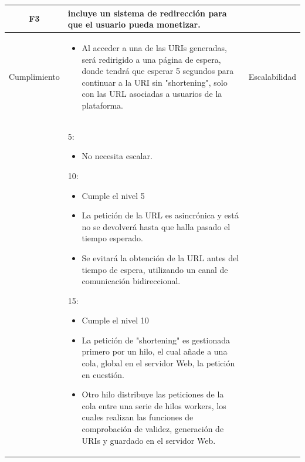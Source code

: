 \documentclass{article}
\begin{document}
 
\begin{table}[hbtp]
    \footnotesize
    \centering
    \settowidth{}
    \setlength\extrarowheight{5pt}
    \begin{tabulary}{\textwidth}{ C L }
        \textbf{F3} & incluye un sistema de redirección para que el usuario pueda monetizar.
        \\
    \hline
    
    Cumplimiento &
    \begin{itemize}
        
        \item Al acceder a una de las URIs generadas, será redirigido a una página de espera, donde tendrá que esperar 5 segundos para continuar a la URI sin "shortening", solo con las URL asociadas a usuarios de la plataforma.
        
    \end{itemize} &
        
    Escalabilidad\\ &
    5:
    \begin{itemize}
        \item No necesita escalar.
        
    \end{itemize} 
    10:
    \begin{itemize}
        \item Cumple el nivel 5
		
        \item La petición de la URL es asincrónica y está no se devolverá hasta que halla pasado el tiempo esperado.
        \item Se evitará la obtención de la URL antes del tiempo de espera, utilizando un canal de comunicación bidireccional.
        
    \end{itemize} 
    15:
    \begin{itemize}
        \item Cumple el nivel 10
        
        \item La petición de "shortening" es gestionada primero por un hilo, el cual añade a una cola, global en el servidor Web, la petición en cuestión.
        
        \item Otro hilo distribuye las peticiones de la cola entre una serie de hilos workers, los cuales realizan las funciones de comprobación de validez, generación de URIs y guardado en el servidor Web.
        

\end{itemize}
\end{tabulary}
\end{table}
\end{document}
